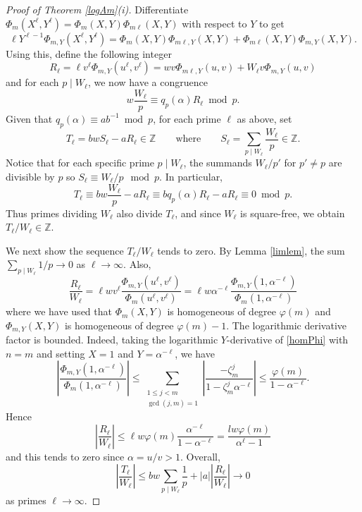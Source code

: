 \documentclass[12pt,reqno]{amsart}
\theoremstyle{remark}
\begin{document}
\begin{proof}[Proof of Theorem \ref{logAm}(i)]
Differentiate $\Phi_m(X^\ell,Y^\ell)=\Phi_m(X,Y)\Phi_{m\ell}(X,Y)$ with respect to $Y$ to get
\[\ell Y^{\ell-1}\Phi_{m,Y}(X^\ell,Y^\ell)=\Phi_m(X,Y)\Phi_{m\ell,Y}(X,Y)+\Phi_{m\ell}(X,Y)\Phi_{m,Y}(X,Y).\]
Using this, define the following integer
\[R_\ell=\ell v^\ell\Phi_{m,Y}(u^\ell,v^\ell)=wv\Phi_{m\ell,Y}(u,v)+W_\ell v\Phi_{m,Y}(u,v)\]
and for each $p\mid W_\ell$, we now have a congruence
\begin{equation*}\label{wWlcong}
w\frac{W_\ell}{p}\equiv q_p(\alpha)R_\ell\bmod p.
\end{equation*}
Given that $q_p(\alpha)\equiv ab^{-1}\bmod p$, for each prime $\ell$ as above, set
\begin{equation}\label{Tell}
T_\ell=bwS_\ell-aR_\ell\in\mathbb{Z}\qquad\text{where}\qquad S_\ell=\sum_{p\mid W_\ell}\frac{W_\ell}{p}\in\mathbb{Z}.
\end{equation}
Notice that for each specific prime $p\mid W_\ell$, the summands $W_\ell/p'$ for $p'\neq p$ are divisible by $p$ so
$S_\ell\equiv W_\ell/p\mod p$. In particular, 
\[T_\ell\equiv bw\frac{W_\ell}{p}-aR_\ell\equiv bq_p(\alpha)R_\ell-aR_\ell\equiv 0\bmod p.\]
Thus primes dividing $W_\ell$ also divide $T_\ell$, and since $W_\ell$ is square-free, we obtain $T_\ell/W_\ell\in\mathbb{Z}$.
\bigskip

We next show the sequence $T_\ell/W_\ell$ tends to zero. By Lemma \ref{limlem}, the sum $\sum_{p\mid W_\ell}1/p\to 0$ as $\ell\to\infty$. Also,
\[\frac{R_\ell}{W_\ell}=\ell wv^\ell\frac{\Phi_{m,Y}(u^\ell,v^\ell)}{\Phi_m(u^\ell,v^\ell)}
=\ell w\alpha^{-\ell}\frac{\Phi_{m,Y}(1,\alpha^{-\ell})}{\Phi_m(1,\alpha^{-\ell})}
\]
where we have used that $\Phi_m(X,Y)$ is homogeneous of degree $\varphi(m)$ and $\Phi_{m,Y}(X,Y)$ is homogeneous of degree $\varphi(m)-1$. The logarithmic derivative factor is bounded. Indeed, taking the logarithmic $Y$-derivative of \eqref{homPhi} with $n=m$ and setting $X=1$ and $Y=\alpha^{-\ell}$, we have 
\[\left|\frac{\Phi_{m,Y}(1,\alpha^{-\ell})}{\Phi_m(1,\alpha^{-\ell})}\right|\leq
\sum_{\substack{1\leq j<m \\ \gcd(j,m)=1}}\left|\frac{-\zeta_m^j}{1-\zeta_m^j\alpha^{-\ell}}\right|
\leq\frac{\varphi(m)}{1-\alpha^{-\ell}}.\]
Hence 
\[\left|\frac{R_\ell}{W_\ell}\right|\leq\ell w\varphi(m)\frac{\alpha^{-\ell}}{1-\alpha^{-\ell}}=\frac{lw\varphi(m)}{\alpha^\ell-1}\]
and this tends to zero since $\alpha=u/v>1$. Overall, 
\[\left|\frac{T_\ell}{W_\ell}\right|\leq bw\sum_{p\mid W_\ell}\frac{1}{p}+|a|\left|\frac{R_\ell}{W_\ell}\right|\longrightarrow 0
\]
as primes $\ell\to\infty$.
\medskip


\end{proof}
\end{document}

